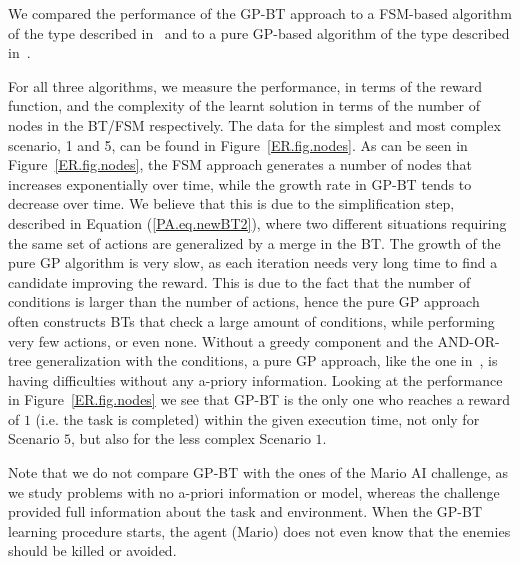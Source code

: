 We compared the performance of the GP-BT approach to a FSM-based algorithm of the type described in~\cite{garcia2000integrated} and to a pure GP-based algorithm of the type described in~\cite{scheper2014}.

For all three algorithms, we measure the performance, in terms of the reward function, and the 
complexity of the learnt solution in terms of the number of nodes in the BT/FSM respectively. The data for the simplest and most complex scenario, 1 and 5, can be found in Figure~\ref{ER.fig.nodes}.
As can be seen in Figure~\ref{ER.fig.nodes}, the FSM approach generates a number of nodes that increases exponentially over time,
while the growth rate in GP-BT tends to decrease over time. We believe that this is due to the simplification step, described in Equation (\ref{PA.eq.newBT2}), where two different situations requiring the same set of actions are generalized by a merge in the BT.
The growth of the pure GP algorithm is very slow, as each iteration needs very long time to find a candidate improving the reward. {This is due to the fact that the number of conditions is larger than the number of actions, hence the pure GP approach often constructs BTs that check a large amount of conditions, while performing very few actions, or even none. Without a greedy component and the AND-OR-tree generalization with the conditions, a pure GP approach, like the one in~\cite{scheper2014},  is having difficulties  without any a-priory information.
}
Looking at the performance in Figure~\ref{ER.fig.nodes} we see that GP-BT is the only one who reaches a reward of $1$ (i.e. the task is completed) within the given execution time, not only for Scenario $5$, but also for the less complex Scenario $1$. 

 \begin{remark}
 Note that we do not compare GP-BT with the ones of the Mario AI challenge,
as we study problems with no a-priori information or model, whereas the challenge
provided full information about the task and environment.
 When the GP-BT learning procedure starts, the agent (Mario) does not even know that the enemies should be killed or avoided.
 \end{remark}


